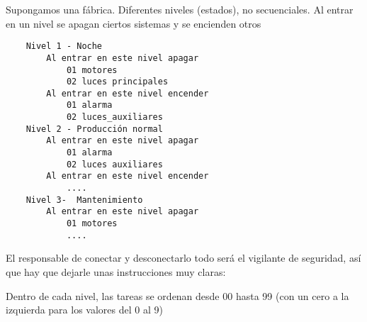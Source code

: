 \documentclass[ucs]{beamer}
\begin{document}
\begin{frame}[fragile]
Supongamos una fábrica. 
Diferentes niveles (estados), no secuenciales.
Al entrar en un nivel se apagan ciertos sistemas y se encienden otros
\begin{scriptsize}
\begin{verbatim}
    Nivel 1 - Noche
        Al entrar en este nivel apagar
            01 motores
            02 luces principales
        Al entrar en este nivel encender
            01 alarma
            02 luces_auxiliares
    Nivel 2 - Producción normal
        Al entrar en este nivel apagar
            01 alarma
            02 luces auxiliares
        Al entrar en este nivel encender
            ....
    Nivel 3-  Mantenimiento     
        Al entrar en este nivel apagar
            01 motores
            ....
\end{verbatim}
\end{scriptsize}
\end{frame}


\begin{frame}[fragile]
El responsable de conectar y desconectarlo todo será
el vigilante de seguridad, así que hay que dejarle
unas instrucciones muy claras:

\vspace{0.6cm}

\vspace{0.6cm}

Dentro de cada nivel, las tareas se ordenan desde 00 hasta 99 (con un cero a la izquierda para
los valores del 0 al 9)

\end{frame}
\end{document}
